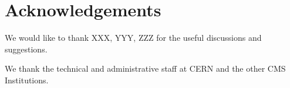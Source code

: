 \section{Acknowledgements}

We would like to thank XXX, YYY, ZZZ 
for the useful discussions and suggestions.

We thank the technical and administrative staff at CERN and the 
other CMS Institutions.
